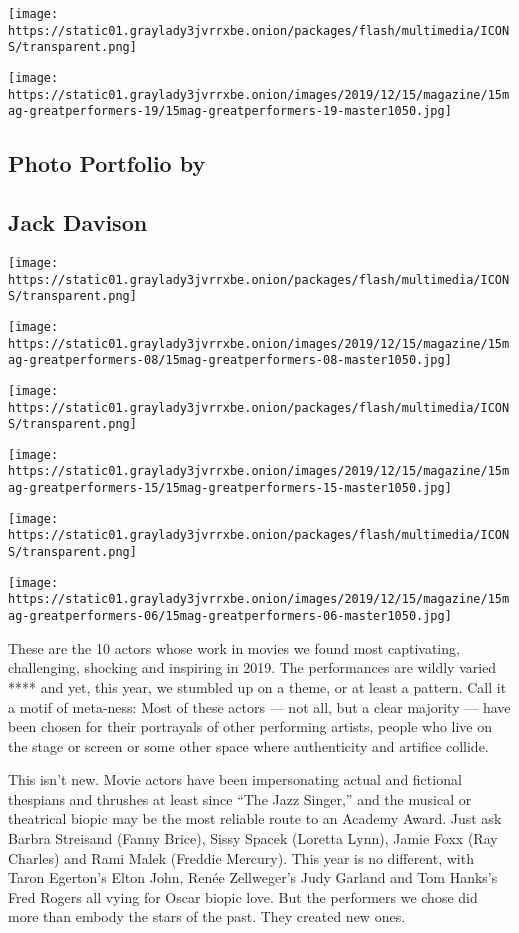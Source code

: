 \texttt{[image: https://static01.graylady3jvrrxbe.onion/packages/flash/multimedia/ICONS/transparent.png]}

\texttt{[image: https://static01.graylady3jvrrxbe.onion/images/2019/12/15/magazine/15mag-greatperformers-19/15mag-greatperformers-19-master1050.jpg]}

\hypertarget{photo-portfolio-by}{%
\subsection{Photo Portfolio by}\label{photo-portfolio-by}}

\hypertarget{jack-davison}{%
\subsection{Jack Davison}\label{jack-davison}}

\texttt{[image: https://static01.graylady3jvrrxbe.onion/packages/flash/multimedia/ICONS/transparent.png]}

\texttt{[image: https://static01.graylady3jvrrxbe.onion/images/2019/12/15/magazine/15mag-greatperformers-08/15mag-greatperformers-08-master1050.jpg]}

\texttt{[image: https://static01.graylady3jvrrxbe.onion/packages/flash/multimedia/ICONS/transparent.png]}

\texttt{[image: https://static01.graylady3jvrrxbe.onion/images/2019/12/15/magazine/15mag-greatperformers-15/15mag-greatperformers-15-master1050.jpg]}

\texttt{[image: https://static01.graylady3jvrrxbe.onion/packages/flash/multimedia/ICONS/transparent.png]}

\texttt{[image: https://static01.graylady3jvrrxbe.onion/images/2019/12/15/magazine/15mag-greatperformers-06/15mag-greatperformers-06-master1050.jpg]}

These are the 10 actors whose work in movies we found most captivating,
challenging, shocking and inspiring in 2019. The performances are wildly
varied **** and yet, this year, we stumbled up on a theme, or at least a
pattern. Call it a motif of meta-ness: Most of these actors --- not all,
but a clear majority --- have been chosen for their portrayals of other
performing artists, people who live on the stage or screen or some other
space where authenticity and artifice collide.

This isn't new. Movie actors have been impersonating actual and
fictional thespians and thrushes at least since ``The Jazz Singer,'' and
the musical or theatrical biopic may be the most reliable route to an
Academy Award. Just ask Barbra Streisand (Fanny Brice), Sissy Spacek
(Loretta Lynn), Jamie Foxx (Ray Charles) and Rami Malek (Freddie
Mercury). This year is no different, with Taron Egerton's Elton John,
Renée Zellweger's Judy Garland and Tom Hanks's Fred Rogers all vying for
Oscar biopic love. But the performers we chose did more than embody the
stars of the past. They created new ones.

